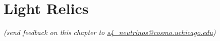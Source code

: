  
\chapter{Light Relics}


\def\beq{\begin{equation}}
\def\eeq{\end{equation}}

\def\bea{\begin{eqnarray}}
\def\eea{\end{eqnarray}}

\def\Neff{N_{\rm eff}}
\def\Nf{N_{\rm eff}}
\def\gs{g_{\star}}
\def\Mpl{M_{\rm P}}


\def\lsim{\raise-.75ex\hbox{$\buildrel<\over\sim$}}

\begin{center}
{\small \it (send feedback on this chapter to \href{mailto:s4_neutrinos@cosmo.uchicago.edu}{s4\_neutrinos@cosmo.uchicago.edu})}
\end{center}

